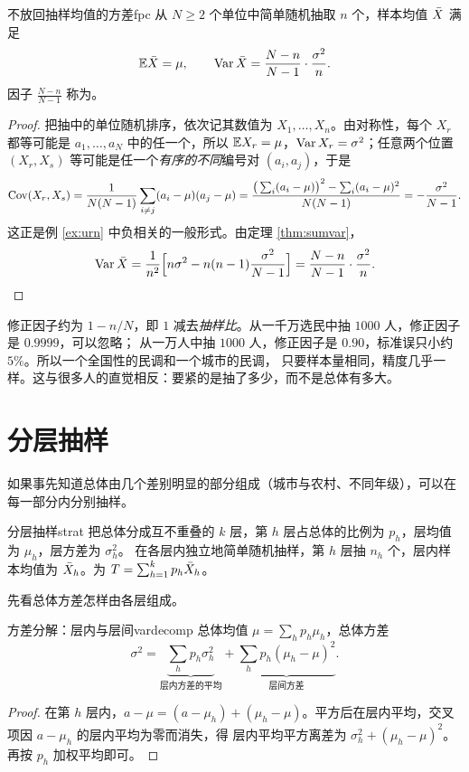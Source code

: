 \begin{theorem}{不放回抽样均值的方差}{fpc}
从 $N\ge2$ 个单位中简单随机抽取 $n$ 个，样本均值 $\bar{X}$ 满足
\[
\mathbb{E}\bar{X}=\mu,\qquad \operatorname{Var}\bar{X}=\frac{N-n}{N-1}\cdot\frac{\sigma^2}{n}.
\]
因子 $\frac{N-n}{N-1}$ 称为。
\end{theorem}
\begin{proof}
把抽中的单位随机排序，依次记其数值为 $X_1,\dots,X_n$。由对称性，每个 $X_r$ 都等可能是 $a_1,\dots,a_N$ 中的任一个，所以
$\mathbb{E} X_r=\mu$，$\operatorname{Var} X_r=\sigma^2$；任意两个位置 $(X_r,X_s)$ 等可能是任一个\emph{有序的不同}编号对 $(a_i,a_j)$，于是
\[
\operatorname{Cov}(X_r,X_s)=\frac{1}{N(N-1)}\sum_{i\ne j}(a_i-\mu)(a_j-\mu)
=\frac{\big(\sum_i(a_i-\mu)\big)^2-\sum_i(a_i-\mu)^2}{N(N-1)}=-\frac{\sigma^2}{N-1}.
\]
这正是例 \ref{ex:urn} 中负相关的一般形式。由定理 \ref{thm:sumvar}，
\[
\operatorname{Var}\bar{X}=\frac1{n^2}\Big[n\sigma^2-n(n-1)\frac{\sigma^2}{N-1}\Big]=\frac{N-n}{N-1}\cdot\frac{\sigma^2}{n}.
\]
\end{proof}

\begin{intuition}
修正因子约为 $1-n/N$，即 $1$ 减去\emph{抽样比}。从一千万选民中抽 $1000$ 人，修正因子是 $0.9999$，可以忽略；
从一万人中抽 $1000$ 人，修正因子是 $0.90$，标准误只小约 $5\%$。所以一个全国性的民调和一个城市的民调，
只要样本量相同，精度几乎一样。这与很多人的直觉相反：要紧的是抽了多少，而不是总体有多大。
\end{intuition}

\section{分层抽样}

如果事先知道总体由几个差别明显的部分组成（城市与农村、不同年级），可以在每一部分内分别抽样。

\begin{definition}{分层抽样}{strat}
把总体分成互不重叠的 $k$ 层，第 $h$ 层占总体的比例为 $p_h$，层均值为 $\mu_h$，层方差为 $\sigma_h^2$。
在各层内独立地简单随机抽样，第 $h$ 层抽 $n_h$ 个，层内样本均值为 $\bar{X}_h$。为
$T=\sum_{h=1}^kp_h\bar{X}_h$。
\end{definition}

先看总体方差怎样由各层组成。

\begin{proposition}{方差分解：层内与层间}{vardecomp}
总体均值 $\mu=\sum_hp_h\mu_h$，总体方差
\[
\sigma^2=\underbrace{\sum_hp_h\sigma_h^2}_{\text{层内方差的平均}}+\underbrace{\sum_hp_h(\mu_h-\mu)^2}_{\text{层间方差}} .
\]
\end{proposition}
\begin{proof}
在第 $h$ 层内，$a-\mu=(a-\mu_h)+(\mu_h-\mu)$。平方后在层内平均，交叉项因 $a-\mu_h$ 的层内平均为零而消失，得
层内平均平方离差为 $\sigma_h^2+(\mu_h-\mu)^2$。再按 $p_h$ 加权平均即可。
\end{proof}

